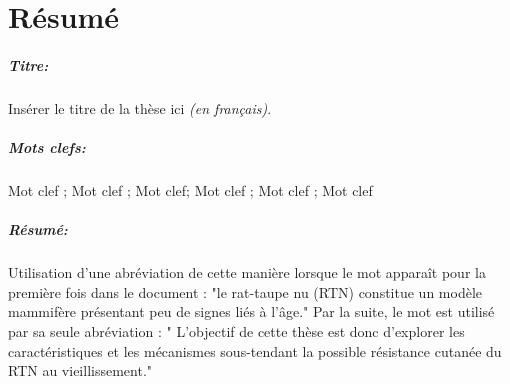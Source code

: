 \chapter*{Résumé}

\begin{mdframed}
\vspace{-.25cm}
\paragraph*{Titre:} Insérer le titre de la thèse ici \textit{(en français)}.

\begin{small}
\vspace{-.25cm}
\paragraph*{Mots clefs:} Mot clef ; Mot clef ; Mot clef; Mot clef ;  Mot clef ; Mot clef

\vspace{-.5cm}
\setlength{\columnsep}{12pt} %
\begin{multicols}{2}
\paragraph*{Résumé:} 
Utilisation d'une abréviation de cette manière lorsque le mot apparaît pour la première fois dans le document : "le rat-taupe nu (\acrshort{RTN}) constitue un modèle mammifère présentant peu de signes liés à l’âge." 
Par la suite, le mot est utilisé par sa seule abréviation : " L'objectif de cette thèse est donc d'explorer les caractéristiques et les mécanismes sous-tendant la possible résistance cutanée du \acrshort{RTN} au vieillissement."

\lipsum[1-4]


\end{multicols}
\end{small}
\end{mdframed}

\clearpage 

